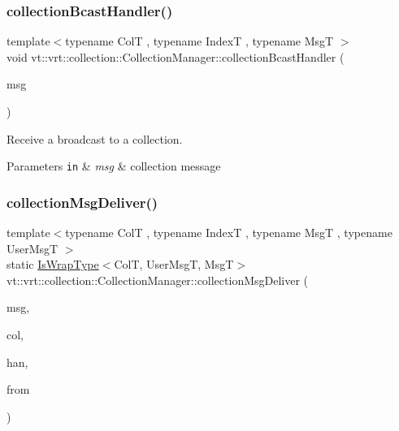 \subsubsection{\texorpdfstring{collection\+Bcast\+Handler()}{collectionBcastHandler()}}
{\footnotesize\ttfamily template$<$typename ColT , typename IndexT , typename MsgT $>$ \\
void vt\+::vrt\+::collection\+::\+Collection\+Manager\+::collection\+Bcast\+Handler (\begin{DoxyParamCaption}\item[{MsgT $\ast$}]{msg }\end{DoxyParamCaption})\hspace{0.3cm}{\ttfamily [static]}}



Receive a broadcast to a collection. 


\begin{DoxyParams}[1]{Parameters}
\mbox{\tt in}  & {\em msg} & collection message \\
\hline
\end{DoxyParams}
\mbox{\label{structvt_1_1vrt_1_1collection_1_1_collection_manager_aeefbfe1468c9583c4ffb730b6fbdd263}} 
\subsubsection{\texorpdfstring{collection\+Msg\+Deliver()}{collectionMsgDeliver()}\hspace{0.1cm}{\footnotesize\ttfamily [1/2]}}
{\footnotesize\ttfamily template$<$typename ColT , typename IndexT , typename MsgT , typename User\+MsgT $>$ \\
static \hyperlink{structvt_1_1vrt_1_1collection_1_1_collection_manager_a1f91c97ed52237c3a3576dfbbe87c8f8}{Is\+Wrap\+Type}$<$ColT, User\+MsgT, MsgT$>$ vt\+::vrt\+::collection\+::\+Collection\+Manager\+::collection\+Msg\+Deliver (\begin{DoxyParamCaption}\item[{MsgT $\ast$}]{msg,  }\item[{\hyperlink{structvt_1_1vrt_1_1collection_1_1_collection_base}{Collection\+Base}$<$ ColT, IndexT $>$ $\ast$}]{col,  }\item[{\hyperlink{namespacevt_af64846b57dfcaf104da3ef6967917573}{Handler\+Type}}]{han,  }\item[{\hyperlink{namespacevt_a866da9d0efc19c0a1ce79e9e492f47e2}{Node\+Type}}]{from }\end{DoxyParamCaption})\hspace{0.3cm}{\ttfamily [static]}}



